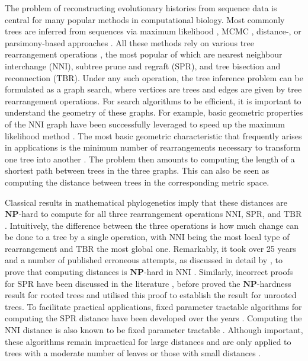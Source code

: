 \documentclass[11pt]{amsart}
\newcommand{\nni}{\mathrm{NNI}}
\newcommand{\spr}{\mathrm{SPR}}
\newcommand{\tbr}{\mathrm{TBR}}
\newcommand{\np}{\mathbf{NP}}
\begin{document}
The problem of reconstructing evolutionary histories from sequence data is central for many popular methods in computational biology.
Most commonly trees are inferred from sequences via maximum likelihood \autocite{Stamatakis2006-xb, Guindon2010-lo}, MCMC \autocite{Ronquist2003-eq, Suchard2018-tw, Bouckaert2019-yr}, distance-, or parsimony-based approaches \autocite{Tamura2011-ky}.
All these methods rely on various tree rearrangement operations \autocite{Semple2003-nj}, the most popular of which are nearest neighbour interchange ($\nni$), subtree prune and regraft ($\spr$), and tree bisection and reconnection ($\tbr$).
Under any such operation, the tree inference problem can be formulated as a graph search, where vertices are trees and edges are given by tree rearrangement operations.
For search algorithms to be efficient, it is important to understand the geometry of these graphs.
For example, basic geometric properties of the $\nni$ graph have been successfully leveraged to speed up the maximum likelihood method \autocite{Nguyen2015-sp}.
The most basic geometric characteristic that frequently arises in applications is the minimum number of rearrangements necessary to transform one tree into another \autocite{Semple2003-nj}.
The problem then amounts to computing the length of a shortest path between trees in the three graphs.
This can also be seen as computing the distance between trees in the corresponding metric space.

Classical results in mathematical phylogenetics imply that these distances are $\np$-hard to compute for all three rearrangement operations $\nni$, $\spr$, and $\tbr$ \autocite{Dasgupta2000-xa, Bordewich2005-nx, Hickey2008-wv, Allen2001-ky}.
Intuitively, the difference between the three operations is how much change can be done to a tree by a single operation, with $\nni$ being the most local type of rearrangement and $\tbr$ the most global one.
Remarkably, it took over 25 years and a number of published erroneous attempts, as discussed in detail by \textcite{Dasgupta2000-xa}, to prove that computing distances is $\np$-hard in $\nni$ \autocite{Dasgupta2000-xa}.
Similarly, incorrect proofs for $\spr$ have been discussed in the literature \autocite{Hein1996-em, Allen2001-ky}, before \textcite{Bordewich2005-nx} proved the $\np$-hardness result for rooted trees and \textcite{Hickey2008-wv} utilised this proof to establish the result for unrooted trees.
To facilitate practical applications, fixed parameter tractable algorithms \autocite{Downey2013-nd} for computing the $\spr$ distance have been developed over the years \autocite{Whidden2010-bw, Bordewich2005-nx, Whidden2018-fw}.
Computing the $\nni$ distance is also known to be fixed parameter tractable \autocite{DasGupta1999-xf}.
Although important, these algorithms remain impractical for large distances and are only applied to trees with a moderate number of leaves or those with small distances \autocite{Whidden2018-fw}.
\end{document}
